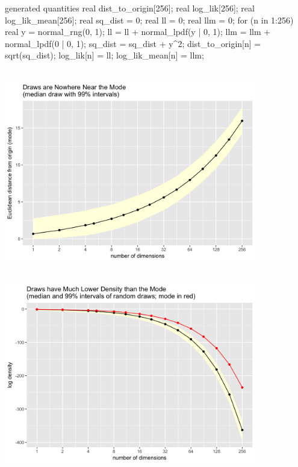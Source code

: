 \documentclass[10pt]{report}
\begin{document}
%
\vspace*{-4pt}
\begin{stancode}
generated quantities {
  real dist_to_origin[256];
  real log_lik[256];
  real log_lik_mean[256];
  {
    real sq_dist = 0;  real ll = 0;  real llm = 0;
    for (n in 1:256) {
      real y = normal_rng(0, 1);
      ll = ll + normal_lpdf(y | 0, 1);
      llm = llm + normal_lpdf(0 | 0, 1);
      sq_dist = sq_dist + y^2;
      dist_to_origin[n] = sqrt(sq_dist);
      log_lik[n] = ll;
      log_lik_mean[n] = llm;
    }
  }
}
\end{stancode}


%
\\
\spc
\includegraphics[width=0.825\textwidth]{img/normal-curse-value.png}


%
\\
\spc
\includegraphics[width=0.825\textwidth]{img/normal-curse-density.png}
\end{document}
